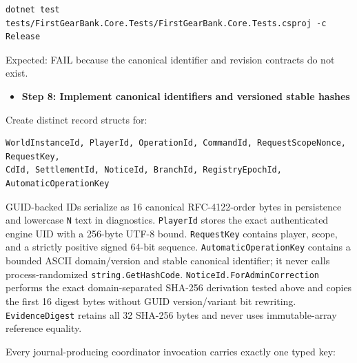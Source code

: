 \documentclass[
  10pt,
  letterpaper,
]{article}
\newcommand{\passthrough}[1]{#1}
\providecommand{\tightlist}{%
  \setlength{\itemsep}{0pt}\setlength{\parskip}{0pt}}
\begin{document}
\begin{lstlisting}
dotnet test tests/FirstGearBank.Core.Tests/FirstGearBank.Core.Tests.csproj -c Release
\end{lstlisting}

Expected: FAIL because the canonical identifier and revision contracts
do not exist.

\begin{itemize}
\tightlist
\item[$\square$]
  \textbf{Step 8: Implement canonical identifiers and versioned stable
  hashes}
\end{itemize}

Create distinct record structs for:

\begin{lstlisting}
WorldInstanceId, PlayerId, OperationId, CommandId, RequestScopeNonce, RequestKey,
CdId, SettlementId, NoticeId, BranchId, RegistryEpochId, AutomaticOperationKey
\end{lstlisting}

GUID-backed IDs serialize as 16 canonical RFC-4122-order bytes in
persistence and lowercase \passthrough{\lstinline!N!} text in
diagnostics. \passthrough{\lstinline!PlayerId!} stores the exact
authenticated engine UID with a 256-byte UTF-8 bound.
\passthrough{\lstinline!RequestKey!} contains player, scope, and a
strictly positive signed 64-bit sequence.
\passthrough{\lstinline!AutomaticOperationKey!} contains a bounded ASCII
domain/version and stable canonical identifier; it never calls
process-randomized \passthrough{\lstinline!string.GetHashCode!}.
\texttt{NoticeId.}\allowbreak{}\texttt{ForAdminCorrection} performs the
exact domain-separated SHA-256 derivation tested above and copies the
first 16 digest bytes without GUID version/variant bit rewriting.
\passthrough{\lstinline!EvidenceDigest!} retains all 32 SHA-256 bytes
and never uses immutable-array reference equality.

Every journal-producing coordinator invocation carries exactly one typed
key:
\end{document}
